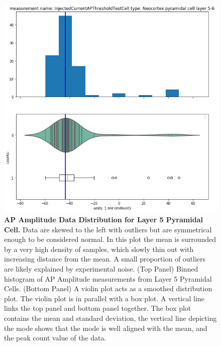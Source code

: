 \begin{figure} 
    \begin{center}
    \includegraphics[scale=0.8]{figures/mean_well_served2.png}
    \end{center}
    \caption[AP Amplitude Data Distribution for Layer 5 Pyramidal Cell]{\textbf{AP Amplitude Data Distribution for Layer 5 Pyramidal Cell.} Data are skewed to the left with outliers but are symmetrical enough to be considered normal. In this plot the mean is surrounded by a very high density of samples, which slowly thin out with increasing distance from the mean. A small proportion of outliers are likely explained by experimental noise. (Top Panel) Binned histogram of AP Amplitude measurements from Layer 5 Pyramidal Cells. (Bottom Panel) A violin plot acts as a smoothed distribution plot. The violin plot is in parallel with a box plot. A vertical line links the top panel and bottom panel together. The box plot contains the mean and standard deviation, the vertical line depicting the mode shows that the mode is well aligned with the mean, and the peak count value of the data.}
    \label{fig:normal-feature2}
\end{figure}   
 
